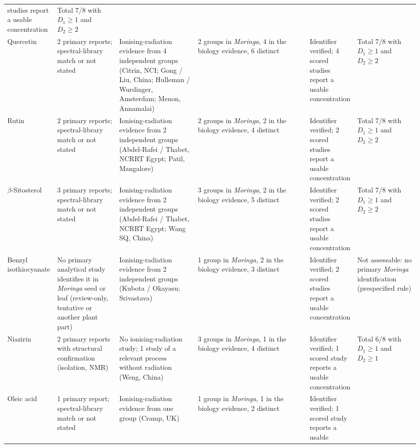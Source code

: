 \begin{landscape}
\begin{longtable}{@{}L{0.11\linewidth} L{0.15\linewidth} L{0.19\linewidth}
    L{0.27\linewidth} L{0.11\linewidth} L{0.15\linewidth}@{}}
      studies report a usable concentration & Total 7/8 with $D_1\ge1$ and $D_2\ge2$ \\
  Quercetin & 2 primary reports; spectral-library match or not stated & Ionising-radiation
      evidence from 4 independent groups (Citrin, NCI; Gong / Liu, China; Hulleman /
      Wurdinger, Amsterdam; Menon, Annamalai) & 2 groups in \textit{Moringa}, 4 in the
      biology evidence, 6 distinct & Identifier verified; 4 scored studies report a usable
      concentration & Total 7/8 with $D_1\ge1$ and $D_2\ge2$ \\
  Rutin & 2 primary reports; spectral-library match or not stated & Ionising-radiation
      evidence from 2 independent groups (Abdel-Rafei / Thabet, NCRRT Egypt; Patil,
      Mangalore) & 2 groups in \textit{Moringa}, 2 in the biology evidence, 4 distinct
    & Identifier verified; 2 scored studies report a usable concentration
    & Total 7/8 with $D_1\ge1$ and $D_2\ge2$ \\
  $\beta$-Sitosterol & 3 primary reports; spectral-library match or not stated
    & Ionising-radiation evidence from 2 independent groups (Abdel-Rafei / Thabet, NCRRT
      Egypt; Wang SQ, China) & 3 groups in \textit{Moringa}, 2 in the biology evidence, 5
      distinct & Identifier verified; 2 scored studies report a usable concentration
    & Total 7/8 with $D_1\ge1$ and $D_2\ge2$ \\
  Benzyl isothiocyanate & No primary analytical study identifies it in \textit{Moringa}
      seed or leaf (review-only, tentative or another plant part) & Ionising-radiation
      evidence from 2 independent groups (Kubota / Okayasu; Srivastava) & 1 group in
      \textit{Moringa}, 2 in the biology evidence, 3 distinct & Identifier verified; 2
      scored studies report a usable concentration & Not assessable: no primary
      \textit{Moringa} identification (prespecified rule) \\
  Niazirin & 2 primary reports with structural confirmation (isolation, NMR) & No
      ionising-radiation study; 1 study of a relevant process without radiation (Weng, China)
    & 3 groups in \textit{Moringa}, 1 in the biology evidence, 4 distinct & Identifier
      verified; 1 scored study reports a usable concentration & Total 6/8 with $D_1\ge1$ and
      $D_2\ge1$ \\
  Oleic acid & 1 primary report; spectral-library match or not stated & Ionising-radiation
      evidence from one group (Cramp, UK) & 1 group in \textit{Moringa}, 1 in the biology
      evidence, 2 distinct & Identifier verified; 1 scored study reports a usable

\end{longtable}
\end{landscape}
